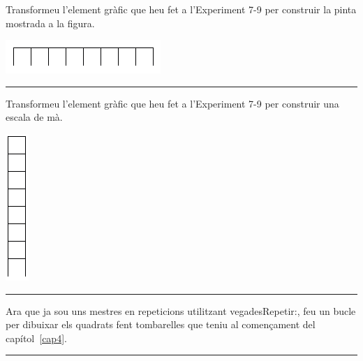\begin{center}
\colorbox{black}{}
\end{center}
{\small
\noindent
Transformeu l'element gràfic que heu fet a l'Experiment 7-9 per construir la pinta mostrada a la figura.}
\begin{center}
\includegraphics[scale=0.8]{Imatges/figuraE7-10.png} 
\end{center}
\noindent
\rule{\textwidth}{3pt}
\newpage
\begin{center}
\colorbox{black}{}
\end{center}
{\small
\noindent
Transformeu l'element gràfic que heu fet a l'Experiment 7-9 per construir una escala de mà.}
\begin{center}
\includegraphics[scale=1.0]{Imatges/figuraE7-11.png} 
\end{center}
\noindent
\rule{\textwidth}{3pt}

\begin{center}
\colorbox{black}{}
\end{center}
{\small
\noindent
Ara que ja sou uns mestres en repeticions utilitzant \textsf{vegadesRepetir:}, feu un bucle per dibuixar els quadrats fent tombarelles que teniu al començament del capítol~\ref{cap4}. }\\
\noindent
\rule{\textwidth}{3pt}

